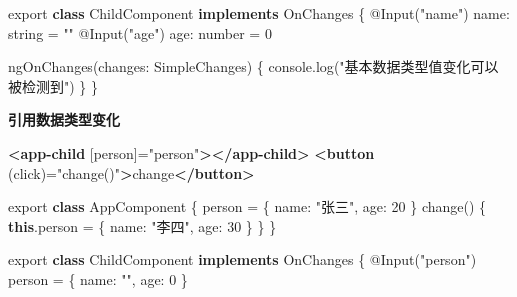\documentclass[
]{article}
\newenvironment{Shaded}{}{}
\newcommand{\AttributeTok}[1]{\textcolor[rgb]{0.49,0.56,0.16}{#1}}
\newcommand{\BuiltInTok}[1]{#1}
\newcommand{\DataTypeTok}[1]{\textcolor[rgb]{0.56,0.13,0.00}{#1}}
\newcommand{\DecValTok}[1]{\textcolor[rgb]{0.25,0.63,0.44}{#1}}
\newcommand{\FunctionTok}[1]{\textcolor[rgb]{0.02,0.16,0.49}{#1}}
\newcommand{\ImportTok}[1]{#1}
\newcommand{\KeywordTok}[1]{\textcolor[rgb]{0.00,0.44,0.13}{\textbf{#1}}}
\newcommand{\NormalTok}[1]{#1}
\newcommand{\OperatorTok}[1]{\textcolor[rgb]{0.40,0.40,0.40}{#1}}
\newcommand{\OtherTok}[1]{\textcolor[rgb]{0.00,0.44,0.13}{#1}}
\newcommand{\StringTok}[1]{\textcolor[rgb]{0.25,0.44,0.63}{#1}}
\begin{document}
\begin{enumerate}
\begin{Shaded}
\begin{Highlighting}[]
\ImportTok{export} \KeywordTok{class}\NormalTok{ ChildComponent }\KeywordTok{implements}\NormalTok{ OnChanges \{}
\NormalTok{  @}\FunctionTok{Input}\NormalTok{(}\StringTok{"name"}\NormalTok{) }\DataTypeTok{name}\OperatorTok{:}\NormalTok{ string }\OperatorTok{=} \StringTok{""}
\NormalTok{	@}\FunctionTok{Input}\NormalTok{(}\StringTok{"age"}\NormalTok{) }\DataTypeTok{age}\OperatorTok{:}\NormalTok{ number }\OperatorTok{=} \DecValTok{0}

  \FunctionTok{ngOnChanges}\NormalTok{(}\DataTypeTok{changes}\OperatorTok{:}\NormalTok{ SimpleChanges) \{}
    \BuiltInTok{console}\OperatorTok{.}\FunctionTok{log}\NormalTok{(}\StringTok{"基本数据类型值变化可以被检测到"}\NormalTok{)}
\NormalTok{  \}}
\NormalTok{\}}
\end{Highlighting}
\end{Shaded}

  \textbf{引用数据类型变化}

\begin{Shaded}
\begin{Highlighting}[]
\KeywordTok{\textless{}app{-}child}\OtherTok{ [person]=}\StringTok{"person"}\KeywordTok{\textgreater{}\textless{}/app{-}child\textgreater{}}
\KeywordTok{\textless{}button}\OtherTok{ (click)=}\StringTok{"change()"}\KeywordTok{\textgreater{}}\NormalTok{change}\KeywordTok{\textless{}/button\textgreater{}}
\end{Highlighting}
\end{Shaded}

\begin{Shaded}
\begin{Highlighting}[]
\ImportTok{export} \KeywordTok{class}\NormalTok{ AppComponent \{}
\NormalTok{  person }\OperatorTok{=}\NormalTok{ \{ }\DataTypeTok{name}\OperatorTok{:} \StringTok{"张三"}\OperatorTok{,} \DataTypeTok{age}\OperatorTok{:} \DecValTok{20}\NormalTok{ \}}
  \FunctionTok{change}\NormalTok{() \{}
    \KeywordTok{this}\OperatorTok{.}\AttributeTok{person} \OperatorTok{=}\NormalTok{ \{ }\DataTypeTok{name}\OperatorTok{:} \StringTok{"李四"}\OperatorTok{,} \DataTypeTok{age}\OperatorTok{:} \DecValTok{30}\NormalTok{ \}}
\NormalTok{  \}}
\NormalTok{\}}
\end{Highlighting}
\end{Shaded}

\begin{Shaded}
\begin{Highlighting}[]
\ImportTok{export} \KeywordTok{class}\NormalTok{ ChildComponent }\KeywordTok{implements}\NormalTok{ OnChanges \{}
\NormalTok{  @}\FunctionTok{Input}\NormalTok{(}\StringTok{"person"}\NormalTok{) person }\OperatorTok{=}\NormalTok{ \{ }\DataTypeTok{name}\OperatorTok{:} \StringTok{""}\OperatorTok{,} \DataTypeTok{age}\OperatorTok{:} \DecValTok{0}\NormalTok{ \}}


\end{Highlighting}
\end{Shaded}
\end{enumerate}
\end{document}
